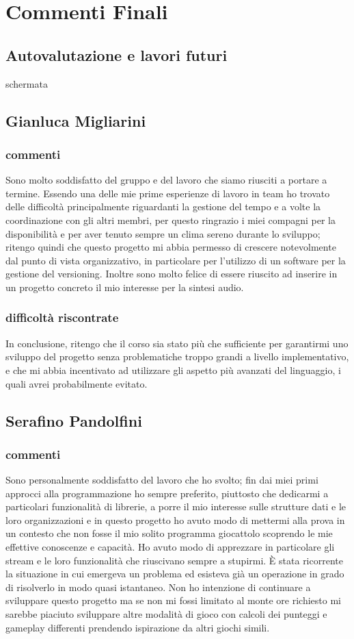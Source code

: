 \documentclass[a4paper,12pt]{report}
\begin{document}
\chapter{Commenti Finali}
\section{Autovalutazione e lavori futuri} 
schermata 
\newpage

\section{Gianluca Migliarini}
\subsection{commenti}
Sono molto soddisfatto del gruppo e del lavoro che siamo riusciti a portare a termine.
Essendo una delle mie prime esperienze di lavoro in team ho trovato delle difficoltà principalmente riguardanti
la gestione del tempo e a volte la coordinazione con gli altri membri, per questo ringrazio i miei compagni per la disponibilità e per aver tenuto sempre un clima sereno durante lo sviluppo; ritengo quindi che questo progetto mi abbia permesso di crescere notevolmente dal punto di vista organizzativo, in particolare per l'utilizzo di un software per la gestione del versioning.
Inoltre sono molto felice di essere riuscito ad inserire in un progetto concreto il mio interesse per la sintesi audio.
\subsection{difficoltà riscontrate}
In conclusione, ritengo che il corso sia stato più che sufficiente per garantirmi uno sviluppo del progetto senza problematiche troppo grandi a livello implementativo, e che mi abbia incentivato ad utilizzare gli aspetto più avanzati del linguaggio, i quali avrei probabilmente evitato.
\newpage
\section{Serafino Pandolfini}
\subsection{commenti}
Sono personalmente soddisfatto del lavoro che ho svolto; fin dai miei primi approcci alla programmazione ho sempre preferito, piuttosto che dedicarmi a particolari funzionalità di librerie, a porre il mio interesse sulle strutture dati e le loro organizzazioni e in questo progetto ho avuto modo di mettermi alla prova in un contesto che non fosse il mio solito programma giocattolo scoprendo le mie effettive conoscenze e capacità. Ho avuto modo di apprezzare in particolare gli stream e le loro funzionalità che riuscivano sempre a stupirmi. È stata ricorrente la situazione in cui emergeva un problema ed esisteva già un operazione in grado di risolverlo in modo quasi istantaneo.
Non ho intenzione di continuare a sviluppare questo progetto ma se non mi fossi limitato al monte ore richiesto mi sarebbe piaciuto sviluppare altre modalità di gioco con calcoli dei punteggi e gameplay differenti prendendo ispirazione da altri giochi simili. 
\end{document}
